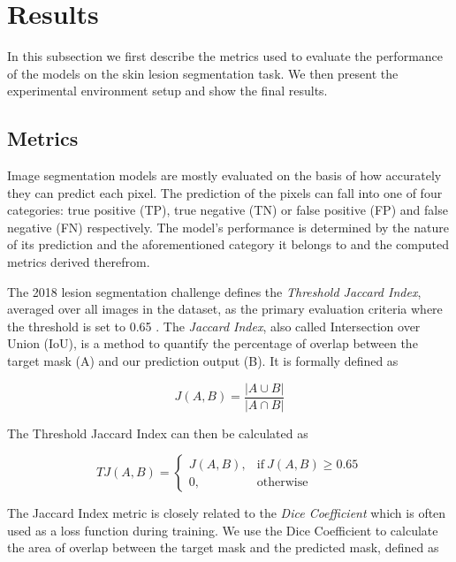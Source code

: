 \section{Results}

In this subsection we first describe the metrics used to evaluate the performance of the models on the skin lesion segmentation task. We then present the experimental environment setup and show the final results.

\subsection{Metrics}

Image segmentation models are mostly evaluated on the basis of how accurately they can predict each pixel. The prediction of the pixels can fall into one of four categories: true positive (TP), true negative (TN) or false positive (FP) and false negative (FN) respectively. The model’s performance is determined by the nature of its prediction and the aforementioned category it belongs to and the computed metrics derived therefrom.

The 2018 lesion segmentation challenge defines the \emph{Threshold Jaccard Index}, averaged over all images in the dataset, as the primary evaluation criteria where the threshold is set to 0.65 \citep{challenge-2018-codella}. The \emph{Jaccard Index}, also called Intersection over Union (IoU), is a method to quantify the percentage of overlap between the target mask (A) and our prediction output (B). It is formally defined as

\begin{equation}
  J(A, B) = \frac{|A \cup B|}{|A \cap B|}
\end{equation}

The Threshold Jaccard Index can then be calculated as

\begin{equation}
  TJ(A, B) = \begin{cases}
      J(A, B), & \text{if}\ J(A, B) \geq{0.65} \\
      0, & \text{otherwise}
    \end{cases}
\end{equation}

The Jaccard Index metric is closely related to the \emph{Dice Coefficient} which is often used as a loss function during training. We use the Dice Coefficient to calculate the area of overlap between the target mask and the predicted mask, defined as

